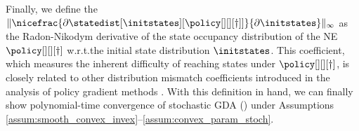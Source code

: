 
Finally, we define the  $\|\nicefrac{\partial\statedist[\initstates][{\policy[][][\dagger]}]}{\partial \initstates} \|_\infty$ as the Radon-Nikodym derivative of the state occupancy distribution of the NE $\policy[][][\dagger]$ w.r.t.\@ the initial state distribution $\initstates$.
This coefficient, which measures the inherent difficulty of reaching states under $\policy[][][\dagger]$, 
is closely related to other distribution mismatch coefficients introduced in the analysis of policy gradient methods \citep{agarwal2020optimality}. 
With this definition in hand, we can finally show polynomial-time convergence of stochastic GDA () under Assumptions \ref{assum:smooth_convex_invex}--\ref{assum:convex_param_stoch}.

